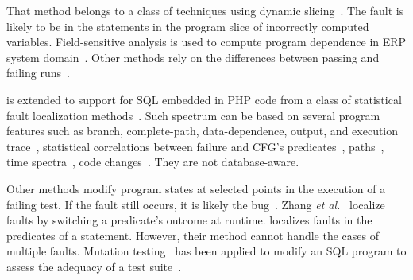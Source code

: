 
That method belongs to a class of techniques using dynamic
slicing~\cite{dor-issta08,litvak10,zhang-pldi04,cleve-icsm10}.
The fault is likely to be in the statements in the
program slice of incorrectly computed variables.
Field-sensitive analysis is used to compute program dependence
in ERP system domain~\cite{litvak10}.  Other methods rely on
the differences between passing and failing
runs~\cite{dallmeier-ecoop05,mani-ase10}.

{\tool} is extended to support for SQL embedded in PHP code from a
class of statistical fault localization
methods~\cite{tarantula05,abreu-ochiai-07,liblit-pldi05}.
Such spectrum can be based on several program features such as branch,
complete-path, data-dependence, output, and execution
trace~\cite{harrold00,santelices09,zhang-fse09,apollo-tse10},
statistical correlations between failure and CFG's
predicates~\cite{liblit-pldi05}, paths~\cite{holmes-icse09},
time spectra~\cite{timespectra08}, code
changes~\cite{stoerzer-fse06}. They are not database-aware.



Other methods modify program states at selected points in the
execution of a failing test. If the fault still occurs, it is likely
the bug~\cite{cleve-icse05,zhang-icse06,jeffrey-issta08}.  Zhang {\em
et al.}~\cite{zhang-icse06} localize faults by switching a predicate's
outcome at runtime. 
{\tool} localizes faults in the predicates of
a  statement. 
However, their method cannot handle the cases of multiple faults.
Mutation testing~\cite{andrews06} has been applied to modify
an SQL program to assess the adequacy of a test suite~\cite{tuya07}.



